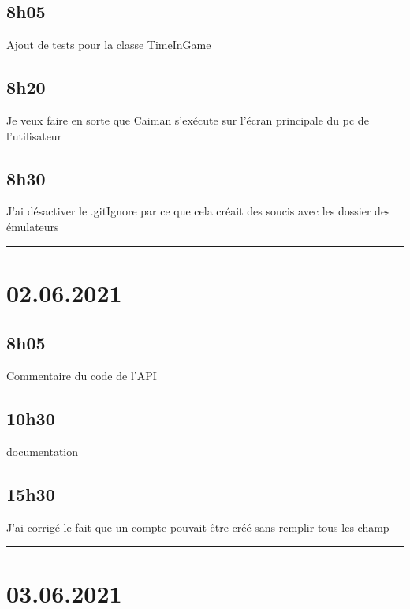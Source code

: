 \documentclass[a4paper,12pt,french]{sphinxmanual}
\begin{document}
\subsection{8h05}
\label{\detokenize{logbook:id179}}
\sphinxAtStartPar
Ajout de tests pour la classe TimeInGame


\subsection{8h20}
\label{\detokenize{logbook:id180}}
\sphinxAtStartPar
Je veux faire en sorte que Caiman s’exécute sur l’écran principale du pc de l’utilisateur


\subsection{8h30}
\label{\detokenize{logbook:id181}}
\sphinxAtStartPar
J’ai désactiver le .gitIgnore par ce que cela créait des soucis avec les dossier des émulateurs


\bigskip\hrule\bigskip



\section{02.06.2021}
\label{\detokenize{logbook:id182}}

\subsection{8h05}
\label{\detokenize{logbook:id183}}
\sphinxAtStartPar
Commentaire du code de l’API


\subsection{10h30}
\label{\detokenize{logbook:id184}}
\sphinxAtStartPar
documentation


\subsection{15h30}
\label{\detokenize{logbook:id185}}
\sphinxAtStartPar
J’ai corrigé le fait que un compte pouvait être créé sans remplir tous les champ


\bigskip\hrule\bigskip



\section{03.06.2021}
\label{\detokenize{logbook:id186}}
\end{document}
